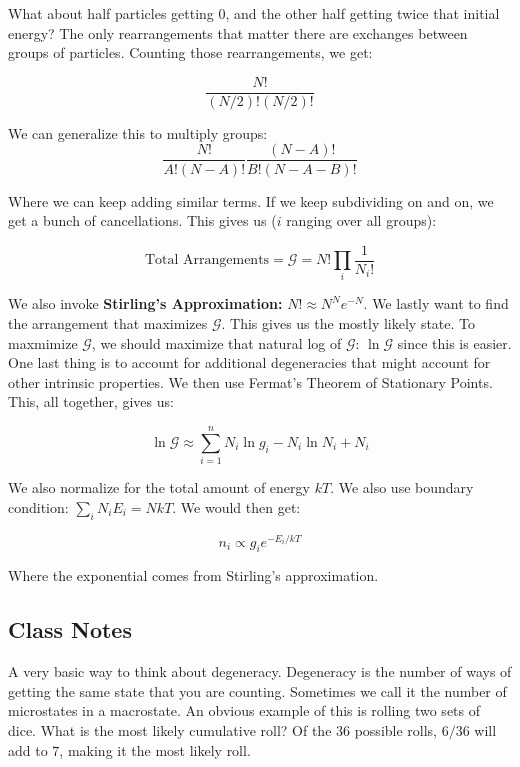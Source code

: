 \documentclass{article}
\begin{document}
What about half particles getting 0, and the other half getting twice that initial energy? The only rearrangements that matter there are exchanges between groups of particles. Counting those rearrangements, we get:

\begin{equation}
    \frac{N!}{(N/2)!(N/2)!}
\end{equation}

We can generalize this to multiply groups:
\begin{equation}
    \frac{N!}{A! (N-A)!} \frac{(N-A)!}{B! (N-A-B)!}
\end{equation}

Where we can keep adding similar terms. If we keep subdividing on and on, we get a bunch of cancellations. This gives us ($i$ ranging over all groups):

\begin{equation}
    \text{Total Arrangements} = \mathcal{G} = N! \prod_i \frac{1}{N_i!}
\end{equation}

We also invoke \textbf{Stirling's Approximation:} $N! \approx N^N e^{-N}$. We lastly want to find the arrangement that maximizes $\mathcal{G}$. This gives us the mostly likely state. To maxmimize $\mathcal{G}$, we should maximize that natural log of $\mathcal{G}$: $\ln \mathcal{G}$ since this is easier. One last thing is to account for additional degeneracies that might account for other intrinsic properties. We then use Fermat's Theorem of Stationary Points. This, all together, gives us:

\begin{equation}
    \ln \mathcal{G} \approx \sum_{i=1}^n N_i \ln g_i - N_i \ln N_i + N_i
\end{equation}

We also normalize for the total amount of energy $kT$. We also use boundary condition: $\sum_{i} N_i E_i = NkT$. We would then get:

\begin{equation}
    n_i \propto g_i e^{-E_i/kT}
\end{equation}

Where the exponential comes from Stirling's approximation. 




\subsection{Class Notes}

A very basic way to think about degeneracy. Degeneracy is the number of ways of getting the same state that you are counting. Sometimes we call it the number of microstates in a macrostate. An obvious example of this is rolling two sets of dice. What is the most likely cumulative roll? Of the $36$ possible rolls, $6/36$ will add to $7$, making it the most likely roll. 
\end{document}
